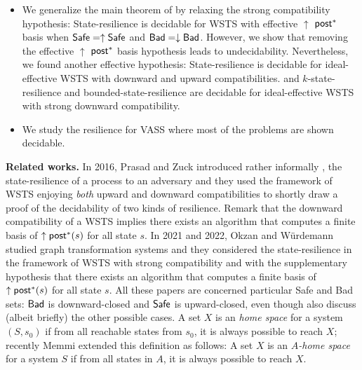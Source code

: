 \begin{itemize}
\item We generalize the main theorem of \cite{DBLP:journals/corr/abs-2108-00889,DBLP:conf/gg/Ozkan22} by relaxing the strong compatibility hypothesis: {\sc State-resilience} is decidable for 
 WSTS with effective 
$\uparrow$ $\textsf{post}^*$ basis
when
$\textsf{Safe}=\uparrow \textsf{Safe}$
and $\textsf{Bad}=\downarrow \textsf{Bad}$. However, we show that removing the effective 
$\uparrow$ $\textsf{post}^*$ basis hypothesis leads to undecidability. Nevertheless, we found another effective hypothesis: {\sc State-resilience} is decidable for ideal-effective WSTS with downward and upward compatibilities. and {\sc $k$-state-resilience} and {\sc bounded-state-resilience} are decidable for ideal-effective WSTS with strong downward compatibility.

\item We study the resilience for VASS where most of the problems are shown decidable.
\end{itemize}


{\bf Related works.} 
In 2016, Prasad and Zuck introduced rather informally \cite{DBLP:journals/corr/PrasadZ16}, the state-resilience of a process to an adversary and they used the framework of WSTS enjoying \emph{both} upward and downward compatibilities to shortly draw a proof of the decidability of two kinds of resilience. Remark that the downward compatibility of a WSTS implies  there exists an algorithm that computes a finite basis of $\uparrow \textsf{post}^*(s)$ for all state $s$. In 2021 and 2022, Okzan and Würdemann \cite{DBLP:journals/corr/abs-2108-00889,DBLP:conf/gg/Ozkan22} studied graph transformation systems and they considered the state-resilience in the framework of WSTS with strong compatibility and with the supplementary hypothesis that there exists an algorithm that computes a finite basis of $\uparrow \textsf{post}^*(s)$ for all state $s$. All these papers are concerned particular Safe and Bad sets: $\textsf{Bad}$ is downward-closed and $\textsf{Safe}$ is upward-closed,
even though \cite{DBLP:conf/gg/Ozkan22} also discuss (albeit briefly) the other possible cases.
A set $X$ is an \emph{home space} for a system $(S,s_0)$ \cite{DBLP:conf/ac/MemmiV86} if from all reachable states from $s_0$, it is always possible to reach $X$; recently Memmi extended this definition as follows: A set $X$ is an \emph{$A$-home space} for a system $S$ \cite{memmi2023invariants} if from all states in $A$, it is always possible to reach $X$.
 
